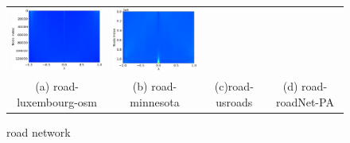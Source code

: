 \documentclass[senior,final,11pt]{iscs-thesis}
\begin{document}
\begin{figure}[htbp]
\begin{tabular}{cccc}
    \includegraphics[width=45mm]{figure/road-usroadsmtx_pdos.png} &
    \includegraphics[width=45mm]{figure/road-roadNet-PAmtx_pdos.png} \\
    (a) road-luxembourg-osm & (b) road-minnesota & (c)road-usroads  & (d) road-roadNet-PA\\ [6pt]
  \end{tabular}
  \caption{road network  }
  \label{fig:road}
\end{figure}
\end{document}
